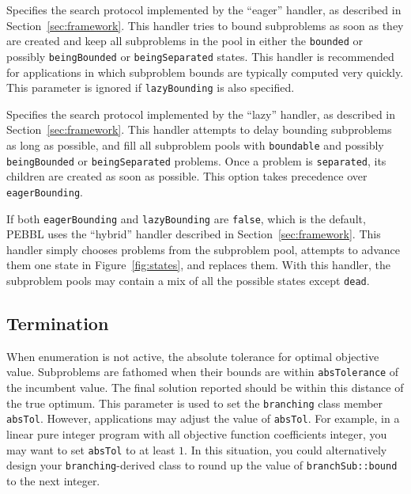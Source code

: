 Specifies the search protocol
implemented by the ``eager'' handler, as described in
Section~\ref{sec:framework}.  This handler tries to bound subproblems
as soon as they are created and keep all subproblems in the pool in
either the \texttt{bounded} or possibly \texttt{beingBounded} or
\texttt{beingSeparated} states.  This handler is recommended for
applications in which subproblem bounds are typically computed very
quickly.  This parameter is ignored if \texttt{lazyBounding} is also
specified.

Specifies the search protocol
implemented by the ``lazy'' handler, as described in
Section~\ref{sec:framework}.  This handler attempts to delay bounding
subproblems as long as possible, and fill all subproblem pools with
\texttt{boundable} and possibly \texttt{beingBounded} or
\texttt{beingSeparated} problems.  Once a problem is
\texttt{separated}, its children are created as soon
as possible.  This option takes precedence over
\texttt{eagerBounding}. 

\vspace{2ex}

If both \texttt{eagerBounding} and \texttt{lazyBounding} are
\texttt{\texttt{false}}, which is the default, PEBBL uses the ``hybrid''
handler described in Section~\ref{sec:framework}.  This handler simply
chooses problems from the subproblem pool, attempts to advance them
one state in Figure~\ref{fig:states}, and replaces them.  With this handler,
the subproblem pools may contain a mix of all the possible states
except \texttt{dead}.

\subsection{Termination}
\vspace{-3ex} 
When enumeration is not active, the absolute
tolerance for optimal objective value.
Subproblems are fathomed when
their bounds are within \texttt{absTolerance} of the incumbent value.
The final solution reported should be within this distance of the true
optimum.  This parameter is used to set the \texttt{branching} class
member \texttt{absTol}.  However, applications may adjust the value
of \texttt{absTol}.  For example, in a linear pure integer program
with all objective function coefficients integer, you may want to set
\texttt{absTol} to at least $1$.  In this situation, you could
alternatively design your \texttt{branching}-derived class to round up
the value of \texttt{branchSub::bound} to the next integer.

